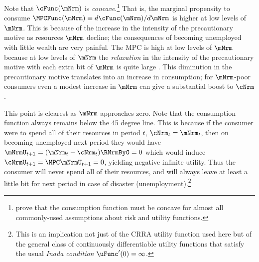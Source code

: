\documentclass{econark}
\begin{document}
Note that $\cFunc(\mNrm)$ is {\it concave}.\footnote{\cite{carroll&kimball:concavity} prove that the consumption
function must be concave for almost all commonly-used assumptions about
risk and utility functions.} That is, the marginal propensity to
consume $\MPCFunc(\mNrm) \equiv d \cFunc(\mNrm)/d \mNrm$ is higher at low levels of $\mNrm$.  This is because
of the increase in the intensity of the precautionary motive as resources
$\mNrm$ decline; the consequences of becoming unemployed with little wealth are very painful.  The MPC is high at low
levels of $\mNrm$ because at low levels of $\mNrm$ the {\it relaxation} in the
intensity of the precautionary motive with each extra bit of $\mNrm$ is quite large \citep{kimball:smallandlarge}.
This diminution in the precautionary motive translates into an increase
in consumption; for $\mNrm$-poor consumers even a modest increase in $\mNrm$ can
give a substantial boost to $\cNrm$.

This point is clearest as $\mNrm$ approaches zero.  Note that the
consumption function always remains below the 45 degree line.  This
is because if the consumer were to spend all of their resources in period $t$, $\cNrm_{t}=\mNrm_{t}$, then on becoming unemployed next period they would have $\mNrmU_{t+1}=(\mNrm_{t}-\cNrm_{t})\RNrmByG=0$ which
would induce $\cNrmU_{t+1}= \MPC \mNrmU_{t+1}=0$, yielding negative
infinite utility.  Thus the consumer will never spend all of their resources, and will always leave at least a little bit for next period
in case of disaster (unemployment).\footnote{This is an implication not just
of the CRRA utility function used here but of the general class of continuously differentiable utility
functions that satisfy the usual {\it Inada condition} $\uFunc^{\prime}(0) = \infty$.}
\end{document}
